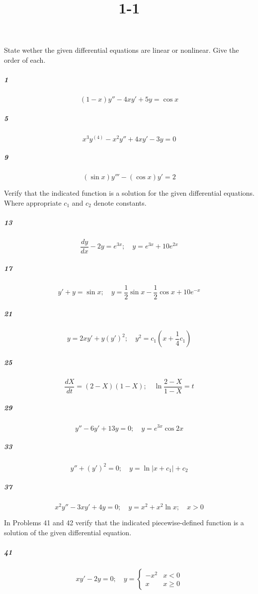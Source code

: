 \documentclass[fleqn]{article}
\title{1-1}
\begin{document}
\maketitle
\pagebreak
 State wether the given differential equations are linear or nonlinear. Give the order of each.

\subparagraph{1}

\[
(1-x)y''-4xy'+5y=\cos x
\]
\vfill



\subparagraph{5}

\[
x^3y^{(4)} - x^2y'' + 4xy' - 3y = 0
\]
\vfill


\pagebreak


\subparagraph{9}

\[
(\sin x)y''' - (\cos x)y' = 2
\]
\vfill

 Verify that the indicated function is a solution for the given differential equations. Where appropriate $c_1$ and $c_2$ denote constants.

\subparagraph{13}

\[
\frac{dy}{dx} - 2y = e^{3x}; \quad y = e^{3x} + 10e^{2x}
\]
\vfill


\pagebreak


\subparagraph{17}

\[
y' + y = \sin x; \quad y = \frac{1}{2}\sin x - \frac{1}{2}\cos x + 10e^{-x}
\]
\vfill



\subparagraph{21}

\[
y = 2xy' + y(y')^{2}; \quad y^{2} = c_{1}(x + \frac{1}{4}c_{1})
\]
\vfill


\pagebreak


\subparagraph{25}

\[
\frac{dX}{dt} = (2 - X)(1 - X); \quad \ln \frac{2 - X}{1 - X} = t
\]
\vfill



\subparagraph{29}

\[
y'' - 6y' + 13y = 0; \quad y = e^{3x} \cos 2x
\]
\vfill


\pagebreak


\subparagraph{33}

\[
y'' + (y')^2 = 0; \quad y = \ln|x + c_1| + c_2
\]
\vfill



\subparagraph{37}

\[
x^{2}y'' - 3xy' + 4y = 0; \quad y = x^{2} + x^{2}\ln x; \quad x > 0
\]
\vfill


\pagebreak
 In Problems 41 and 42 verify that the indicated piecewise-defined function is a solution of the given differential equation.

\subparagraph{41}

\[
    xy' - 2y = 0; \quad y = \begin{cases} -x^2 & x<0 \\ x & x \geq0 \end{cases}
\]
\vfill
\end{document}
